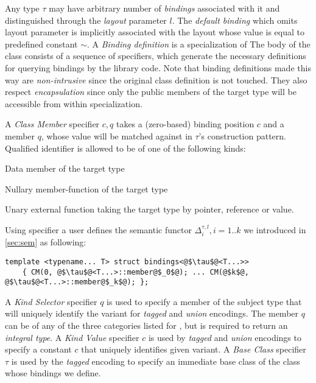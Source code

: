 \noindent
Any type $\tau$ may have arbitrary number of \emph{bindings} associated with it 
and distinguished through the \emph{layout} parameter $l$. The \emph{default 
binding} which omits layout parameter is implicitly associated with the layout whose
value is equal to predefined constant $\sim$. 
A \emph{Binding definition} is a specialization of
The body of the class consists of a sequence of specifiers, which generate the 
necessary definitions for querying bindings by the library code. Note that 
binding definitions made this way are \emph{non-intrusive} since the original 
class definition is not touched. They also respect \emph{encapsulation} since 
only the public members of the target type will be accessible from within 
 specialization.

A \emph{Class Member} specifier $c,q$\code{)} takes a (zero-based) binding 
position $c$ and a member $q$, whose value will be matched against in $\tau$'s 
construction pattern. Qualified identifier is allowed to be of one of the 
following kinds:

\begin{compactitem}
\setlength{\itemsep}{0pt}
\setlength{\parskip}{0pt}
\item Data member of the target type
\item Nullary member-function of the target type
\item Unary external function taking the target type by pointer, reference or value.
\end{compactitem}

\noindent
Using  specifier a user defines the semantic functor 
$\Delta_i^{\tau,l},i=1..k$ we introduced in \textsection\ref{sec:sem} as 
following:

\begin{lstlisting}[keepspaces]
template <typename... T> struct bindings<@$\tau$@<T...>> 
    { CM(0, @$\tau$@<T...>::member@$_0$@); ... CM(@$k$@, @$\tau$@<T...>::member@$_k$@); };
\end{lstlisting}

\noindent
A \emph{Kind Selector} specifier $q$\code{)} is used to specify a member 
of the subject type that will uniquely identify the variant for \emph{tagged} 
and \emph{union} encodings. The member $q$ can be of any of the three categories 
listed for , but is required to return an \emph{integral type}.
A \emph{Kind Value} specifier $c$\code{)} is used by \emph{tagged} and 
\emph{union} encodings to specify a constant $c$ that uniquely identifies given 
variant. 
A \emph{Base Class} specifier $\tau$\code{)} is used by the \emph{tagged}
encoding to specify an immediate base class of the class whose bindings we 
define.

